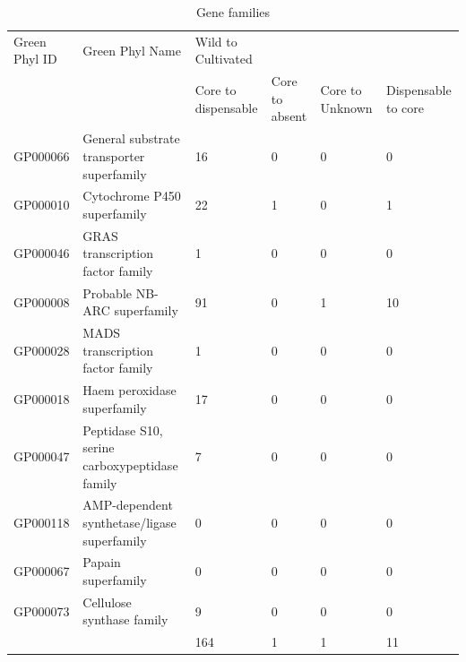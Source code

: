 \documentclass[10pt,letterpaper]{article}
\begin{document}
\begin{table}[]
\centering
\small
\begin{tabular}{llllll}
Green Phyl ID & Green Phyl Name                               & Wild to Cultivated  &               &                &                    \\
              &                                               & Core to dispensable & Core to absent & Core to Unknown & Dispensable to core \\
GP000066      & General substrate transporter superfamily     & 16                 & 0             & 0              & 0                  \\
GP000010      & Cytochrome P450 superfamily                   & 22                 & 1             & 0              & 1                  \\
GP000046      & GRAS transcription factor family              & 1                  & 0             & 0              & 0                  \\
GP000008      & Probable NB-ARC superfamily                   & 91                 & 0             & 1              & 10                 \\
GP000028      & MADS transcription factor family              & 1                  & 0             & 0              & 0                  \\
GP000018      & Haem peroxidase superfamily                   & 17                 & 0             & 0              & 0                  \\
GP000047      & Peptidase S10, serine carboxypeptidase family & 7                  & 0             & 0              & 0                  \\
GP000118      & AMP-dependent synthetase/ligase superfamily   & 0                  & 0             & 0              & 0                  \\
GP000067      & Papain superfamily                            & 0                  & 0             & 0              & 0                  \\
GP000073      & Cellulose synthase family                     & 9                  & 0             & 0              & 0                  \\
              &                                               & 164                & 1             & 1              & 11                
\end{tabular}
\caption{Gene families}
\label{GFmove}
\end{table}
\end{document}
